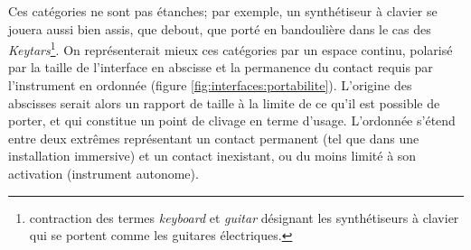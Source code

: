 \par
\noindent Ces catégories ne sont pas étanches; par exemple, un synthétiseur à clavier se jouera aussi bien assis, que debout, que porté en bandoulière dans le cas des \textit{Keytars}\footnote{contraction des termes \textit{keyboard} et \textit{guitar} désignant les synthétiseurs à clavier qui se portent comme les guitares électriques.}. On représenterait mieux ces catégories par un espace continu, polarisé par la taille de l'interface en abscisse et la permanence du contact requis par l'instrument en ordonnée (figure \ref{fig:interfaces:portabilite}). L'origine des abscisses serait alors un rapport de taille à la limite de ce qu'il est possible de porter, et qui constitue un point de clivage en terme d'usage. L'ordonnée s'étend entre deux extrêmes représentant un contact permanent (tel que dans une installation immersive) et un contact inexistant, ou du moins limité à son activation (instrument autonome).







